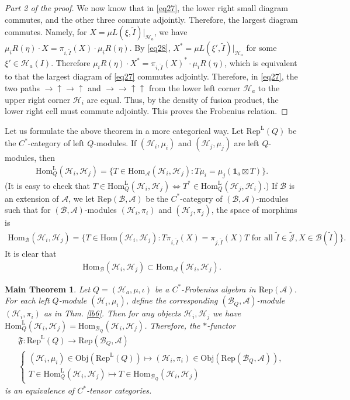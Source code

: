 \documentclass[11pt,b5paper,notitlepage]{article}
\theoremstyle{definition}
\theoremstyle{plain}
\newtheorem{Mthm}{Main Theorem}
\newcommand{\fk}{\mathfrak}
\newcommand{\mc}{\mathcal}
\newcommand{\wtd}{\widetilde}
\newcommand{\id}{\mathbf{1}}
\newcommand{\Hom}{\mathrm{Hom}}
\newcommand{\Rep}{\mathrm{Rep}}
\newcommand{\Jtd}{\widetilde{\mathcal J}}
\newcommand{\RepA}{\mathrm{Rep}(\mathcal A)}
\newcommand{\RepL}{\mathrm{Rep}^{\mathrm{L}}}
\newcommand{\HomL}{\mathrm{Hom}^{\mathrm{L}}}
\newcommand{\Obj}{\mathrm{Obj}}
\numberwithin{equation}{section}
\begin{document}
\begin{proof}[Part 2 of the proof]
We now know that in \eqref{eq27}, the lower right small diagram commutes, and the other three commute adjointly. Therefore, the largest diagram commutes. Namely, for $X=\mu L(\xi,\wtd I)|_{\mc H_a}$, we have $\mu_iR(\eta)\cdot  X=\pi_{i,\wtd I}(X)\cdot \mu_iR(\eta)$. By \eqref{eq28}, $X^*=\mu L(\xi',\wtd I)|_{\mc H_a}$ for some $\xi'\in\mc H_a(I)$. Therefore  $\mu_iR(\eta)\cdot X^*=\pi_{i,\wtd I}(X)^*\cdot \mu_iR(\eta)$, which is equivalent to that the largest diagram of \eqref{eq27} commutes adjointly. Therefore, in \eqref{eq27},  the two paths $\rightarrow \uparrow \rightarrow\uparrow$ and $\rightarrow \rightarrow \uparrow \uparrow$ from the lower left corner $\mc H_a$  to the upper right corner $\mc H_i$ are equal. Thus, by the density of fusion product, the lower right cell must commute adjointly. This proves the Frobenius relation.
\end{proof}


Let us formulate the above theorem in a more categorical way. Let $\RepL(Q)$ be the $C^*$-category of left $Q$-modules. If $(\mc H_i,\mu_i)$ and $(\mc H_j,\mu_j)$ are left $Q$-modules, then 
\begin{align*}
\HomL_Q(\mc H_i,\mc H_j)=\{T\in\Hom_{\mc A}(\mc H_i,\mc H_j):T\mu_i=\mu_j(\id_a\boxtimes T)\}.
\end{align*}
(It is easy to check that $T\in\HomL_Q(\mc H_i,\mc H_j)\Leftrightarrow T^*\in\HomL_Q(\mc H_j,\mc H_i)$.) If $\mc B$ is an extension of $\mc A$, we let $\Rep(\mc B,\mc A)$ be the $C^*$-category of $(\mc B,\mc A)$-modules such that for $(\mc B,\mc A)$-modules $(\mc H_i,\pi_i)$ and $(\mc H_j,\pi_j)$, the space of morphims is 
\begin{align*}
\Hom_{\mc B}(\mc H_i,\mc H_j)=\{T\in\Hom(\mc H_i,\mc H_j):T\pi_{i,\wtd I}(X)=\pi_{j,\wtd I}(X)T\text{ for all }\wtd I\in\Jtd,X\in\mc B(\wtd I)\}.	
\end{align*} 
It is clear that
\begin{align*}
\Hom_{\mc B}(\mc H_i,\mc H_j)\subset \Hom_{\mc A}(\mc H_i,\mc H_j).	
\end{align*}

\begin{Mthm}\label{lb12}
Let $Q=(\mc H_a,\mu,\iota)$ be a $C^*$-Frobenius algebra in $\RepA$. For each left $Q$-module $(\mc H_i,\mu_i)$, define the corresponding $(\mc B_Q,\mc A)$-module $(\mc H_i,\pi_i)$ as in Thm. \ref{lb6}. Then for any objects $\mc H_i,\mc H_j$ we have $\HomL_Q(\mc H_i,\mc H_j)=\Hom_{\mc B_Q}(\mc H_i,\mc H_j)$. Therefore, the $*$-functor 
\begin{gather*}
	\fk F:\RepL(Q)\rightarrow\Rep(\mc B_Q,\mc A)\\
	\left\{
\begin{array}{l}
(\mc H_i,\mu_i)\in\Obj(\RepL(Q))\mapsto (\mc H_i,\pi_i)\in\Obj(\Rep(\mc B_Q,\mc A)),\\[1ex]
T\in\HomL_Q(\mc H_i,\mc H_j)\mapsto  T\in\Hom_{\mc B_Q}(\mc H_i,\mc H_j)		
\end{array}	
	\right.
\end{gather*}
is an equivalence of $C^*$-tensor categories.
\end{Mthm}
\end{document}
